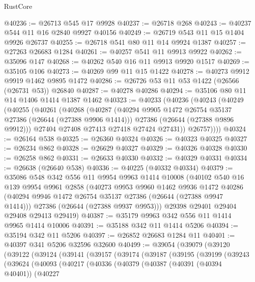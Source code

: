 \begin{lexlean}{RustCore}
\begin{coremodule}
@40236 := @26713 @545 @17 @9928
@40237 := @26718 @268
@40243 := @40237 @544 @11 @16 @2840 @9927 @40156
@40249 := @26719 @543 @11 @15 @1404 @9926 @26737
@40255 := @26718 @541 @80 @11 @14 @9924 @1387
@40257 := @27263 @26683 @1284
@40261 := @40257 @541 @11 @9913 @9922
@40262 := @35096 @147
@40268 := @40262 @540 @16 @11 @9913 @9920 @1517
@40269 := @35105 @106
@40273 := @40269 @99 @11 @15 @1422
@40278 := @40273 @9912 @9919 @1462 @9895 @1472
@40286 := @26726 @53 @11 @53 @1422 (@26566 (@26731 @53)) @26840
@40287 := @40278 @40286
@40294 := @35106 @80 @11 @14 @1406 @1414 @1387 @1462
@40323 := @40233
    (@40236
      (@40243
        (@40249
          (@40255
            (@40261
              (@40268
                (@40287
                  (@40294 @9905 @1472 @26754 @35137 @27386 (@26644 (@27388 @9906 @1414)))
                  @27386
                  (@26644 (@27388 @9896 @9912)))
                @27404
                @27408
                @27413
                @27418
                @27424
                @27431))
            @26757))))
@40324 := @26164 @538
@40325 := @26360 @40324
@40326 := @40323 @40325
@40327 := @26234 @862
@40328 := @26629 @40327
@40329 := @40326 @40328
@40330 := @26258 @862
@40331 := @26633 @40330
@40332 := @40329 @40331
@40334 := @26638 (@26640 @538)
@40336 := @40225 (@40332 @40334)
@40379 := @35086
    @548
    @342
    @556
    @11
    @9954
    @9963
    @1414
    @10008
    (@40102
      @540
      @16
      @139
      @9954
      @9961
      @2858
      (@40273
        @9953
        @9960
        @1462
        @9936
        @1472
        @40286
        (@40294 @9946 @1472 @26754 @35137 @27386 (@26644 (@27388 @9947 @1414)))
        @27386
        (@26644 (@27388 @9937 @9953)))
      @29398
      @29401
      @29404
      @29408
      @29413
      @29419)
@40387 := @35179 @9963 @342 @556 @11 @1414 @9965 @1414 @10006
@40391 := @35188 @342 @11 @1414 @5206
@40394 := @35194 @342 @11 @5206
@40397 := @26852 @26683 @1284 @11
@40401 := @40397 @341 @5206 @32596 @32600
@40499 := @39054
    (@39079
      (@39120
        (@39122
          (@39124
            (@39141
              (@39157
                (@39174
                  (@39187
                    (@39195
                      (@39199
                        (@39243
                          (@39624
                            (@40093
                              (@40217
                                (@40336
                                  (@40379
                                    (@40387
                                      (@40391 (@40394 @40401))
                                      (@40227

\end{coremodule}
\end{lexlean}
